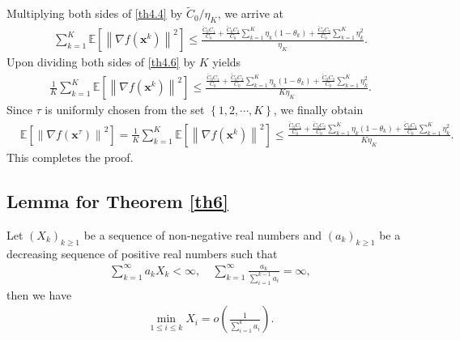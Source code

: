 \documentclass[twoside,11pt]{article}
\begin{document}
Multiplying both sides of \eqref{th4.4} by $\tilde{C}_0/\eta_K$, we arrive at
\begin{equation}\label{th4.6}
   	\begin{aligned}
   	\sum_{k=1}^{K}\mathbb{E}\left[\left\| \nabla f(\mathbf{x}^k)\right\|^2\right]
   	\le\frac{ \frac{{\tilde{C}_0}C_1}{C_0}
   		+\frac{{\tilde{C}_0}C_2}{C_0}\sum_{k=1}^{K}\eta_k{(1-\theta_k)}+\frac{{\tilde{C}_0}C_3}{C_0} \sum_{k=1}^{K}\eta_{k}^2}{\eta_{K}}.
   	\end{aligned}
\end{equation}
   	Upon dividing both sides of \eqref{th4.6} by $K$ yields
   	\begin{equation}\label{th4.7}
   	\begin{aligned}
   	\frac{1}{K}\sum_{k=1}^{K}\mathbb{E}\left[\left\| \nabla f(\mathbf{x}^k)\right\|^2\right]
   	\le\frac{ \frac{{\tilde{C}_0}C_1}{C_0}
   		+\frac{{\tilde{C}_0}C_2}{C_0}\sum_{k=1}^{K}\eta_k{(1-\theta_k)}+\frac{{\tilde{C}_0}C_3}{C_0} \sum_{k=1}^{K}\eta_{k}^2}{K\eta_{K}}.\nonumber
   	\end{aligned}
\end{equation}
Since $\tau$ is uniformly chosen from the set $\left\lbrace 1,2,\cdots,K\right\rbrace$, we finally obtain
\begin{equation}\label{th4.10}
   	\begin{aligned}
   	&\mathbb{E}\left[\left\| \nabla f(\mathbf{x}^{\tau})\right\|^2\right]
   	=\frac{1}{K}\sum_{k=1}^{K}\mathbb{E}\left[\left\| \nabla f(\mathbf{x}^k)\right\|^2\right]
   	\le\frac{ \frac{{\tilde{C}_0}C_1}{C_0}
   	+\frac{{\tilde{C}_0}C_2}{C_0}\sum_{k=1}^{K}\eta_k{(1-\theta_k)}+\frac{{\tilde{C}_0}C_3}{C_0} \sum_{k=1}^{K}\eta_{k}^2}{K\eta_{K}}.\nonumber
   \end{aligned}
\end{equation}
This completes the proof.

\subsection{Lemma for Theorem \ref{th6}}
\begin{lemma}\label{Lema.s.}
Let $\left(  X_k\right)_{k\ge 1}$ be  a sequence of non-negative real numbers and $\left(  a_k\right)_{k\ge 1}$  be a decreasing sequence of positive real numbers such that
\begin{gather}
   	\sum _{k=1}^{\infty}a_{k}X_{k}<\infty,
   	\quad 
   	\sum _{k=1}^{\infty}\frac{a_{k}}{\sum _{i=1}^{k-1}a_{i}}= \infty ,\nonumber
\end{gather}
then we have
\begin{gather} 
   	\min_{1 \le i \le k}X_{i}=o\left( \frac{1}{\sum _{i=1}^{k}a_{i}}\right) .\nonumber
\end{gather}
\end{lemma}
\end{document}
